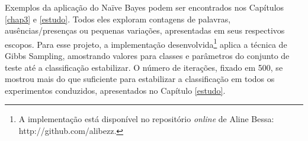 
Exemplos da aplicação do Naïve Bayes podem ser encontrados nos Capítulos \ref{chap3} e \ref{estudo}. Todos eles exploram contagens de palavras, ausências/presenças ou pequenas variações, apresentadas em seus respectivos escopos. Para esse projeto, a implementação desenvolvida\footnote{A implementação está disponível no repositório \emph{online} de Aline Bessa: http://github.com/alibezz.} aplica a técnica de Gibbs Sampling, amostrando valores para classes e parâmetros do conjunto de teste até a classificação estabilizar. O número de iterações, fixado em 500, se mostrou mais do que suficiente para estabilizar a classificação em todos os experimentos conduzidos, apresentados no Capítulo \ref{estudo}. 


